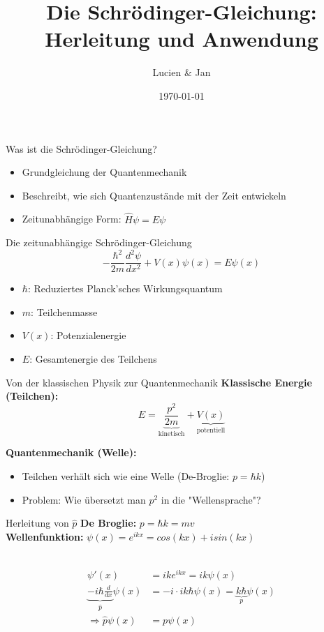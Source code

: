 \documentclass{beamer}
\title{Die Schrödinger-Gleichung: Herleitung und Anwendung}
\author{Lucien \& Jan}
\date{\today}
\begin{document}
    \begin{frame}
        \titlepage
    \end{frame}

%    

    \begin{frame}{Was ist die Schrödinger-Gleichung?}
        \begin{itemize}
            \item Grundgleichung der Quantenmechanik
            \item Beschreibt, wie sich Quantenzustände mit der Zeit entwickeln
            \item Zeitunabhängige Form: $\hat{H}\psi = E\psi$
        \end{itemize}
    \end{frame}

    \begin{frame}{Die zeitunabhängige Schrödinger-Gleichung}
        \[
            -\frac{\hbar^2}{2m}\frac{d^2\psi}{dx^2} + V(x)\psi(x) = E\psi(x)
        \]
        \begin{itemize}
            \item $\hbar$: Reduziertes Planck'sches Wirkungsquantum
            \item $m$: Teilchenmasse
            \item $V(x)$: Potenzialenergie
            \item $E$: Gesamtenergie des Teilchens
        \end{itemize}
    \end{frame}


    \begin{frame}{Von der klassischen Physik zur Quantenmechanik}
        \textbf{Klassische Energie (Teilchen):}
        \[
            E = \underbrace{\frac{p^2}{2m}}_{\text{kinetisch}} + \underbrace{V(x)}_{\text{potentiell}}
        \]

        \textbf{Quantenmechanik (Welle):}
        \begin{itemize}
            \item Teilchen verhält sich wie eine Welle (De-Broglie: $p = \hbar k$)
            \item \alert{Problem:} Wie übersetzt man $p^2$ in die "Wellensprache"?
        \end{itemize}
    \end{frame}

    \begin{frame}{Herleitung von $\hat{p}$}
        \textbf{De Broglie: } $p=\hbar k=mv$\\
        \textbf{Wellenfunktion: } $\psi (x)=e^{ikx}=cos(kx)+i sin(kx)$\\\

        \begin{align*}
            \psi '(x)&=ike^{ikx}=ik\psi(x)\\
            \underbrace{-i\hbar\frac{d}{dx}}_{\hat{p}}\psi (x) &=-i \cdot i k\hbar\psi(x)=\underbrace{k\hbar}_{p}\psi(x)\\
            \Rightarrow \hat{p}\psi(x)&=p\psi(x)
        \end{align*}
    \end{frame}
\end{document}
